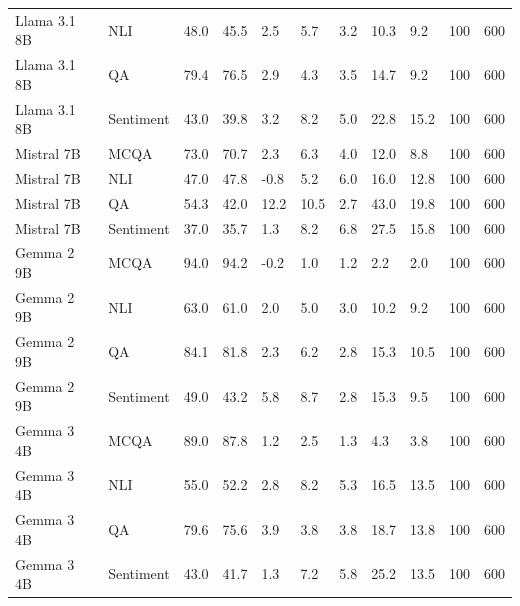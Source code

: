 \begin{tabular}{lllllllllll}
Llama 3.1 8B &       NLI & 48.0 &    45.5 &  2.5 &          5.7 &             3.2 &            10.3 &              9.2 &    100 &       600 \\
Llama 3.1 8B &        QA & 79.4 &    76.5 &  2.9 &          4.3 &             3.5 &            14.7 &              9.2 &    100 &       600 \\
Llama 3.1 8B & Sentiment & 43.0 &    39.8 &  3.2 &          8.2 &             5.0 &            22.8 &             15.2 &    100 &       600 \\
  Mistral 7B &      MCQA & 73.0 &    70.7 &  2.3 &          6.3 &             4.0 &            12.0 &              8.8 &    100 &       600 \\
  Mistral 7B &       NLI & 47.0 &    47.8 & -0.8 &          5.2 &             6.0 &            16.0 &             12.8 &    100 &       600 \\
  Mistral 7B &        QA & 54.3 &    42.0 & 12.2 &         10.5 &             2.7 &            43.0 &             19.8 &    100 &       600 \\
  Mistral 7B & Sentiment & 37.0 &    35.7 &  1.3 &          8.2 &             6.8 &            27.5 &             15.8 &    100 &       600 \\
  Gemma 2 9B &      MCQA & 94.0 &    94.2 & -0.2 &          1.0 &             1.2 &             2.2 &              2.0 &    100 &       600 \\
  Gemma 2 9B &       NLI & 63.0 &    61.0 &  2.0 &          5.0 &             3.0 &            10.2 &              9.2 &    100 &       600 \\
  Gemma 2 9B &        QA & 84.1 &    81.8 &  2.3 &          6.2 &             2.8 &            15.3 &             10.5 &    100 &       600 \\
  Gemma 2 9B & Sentiment & 49.0 &    43.2 &  5.8 &          8.7 &             2.8 &            15.3 &              9.5 &    100 &       600 \\
  Gemma 3 4B &      MCQA & 89.0 &    87.8 &  1.2 &          2.5 &             1.3 &             4.3 &              3.8 &    100 &       600 \\
  Gemma 3 4B &       NLI & 55.0 &    52.2 &  2.8 &          8.2 &             5.3 &            16.5 &             13.5 &    100 &       600 \\
  Gemma 3 4B &        QA & 79.6 &    75.6 &  3.9 &          3.8 &             3.8 &            18.7 &             13.8 &    100 &       600 \\
  Gemma 3 4B & Sentiment & 43.0 &    41.7 &  1.3 &          7.2 &             5.8 &            25.2 &             13.5 &    100 &       600 \\

\end{tabular}
